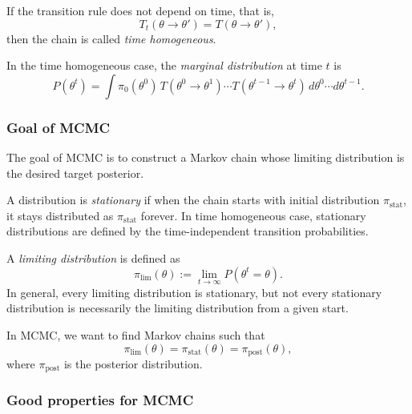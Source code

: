 \documentclass[11pt, titlepage]{article} %
\numberwithin{equation}{section}
\theoremstyle{definition}
\numberwithin{assumption}{section}
\begin{document}
If the transition rule does not depend on time, that is,
\begin{equation*}
    T_t(\theta\to \theta')=T(\theta\to \theta'),
\end{equation*}
then the chain is called \textit{time homogeneous}.

In the time homogeneous case, the \textit{marginal distribution} at time $t$ is
\begin{equation*}
    P(\theta^t)
    =
    \int \pi_0(\theta^0)\,T(\theta^0\to \theta^1)\cdots T(\theta^{t-1}\to \theta^t)\,d\theta^0\cdots d\theta^{t-1}.
\end{equation*}

\subsubsection*{Goal of MCMC}

The goal of MCMC is to construct a Markov chain whose limiting distribution is the desired target posterior. 

A distribution is \textit{stationary} if when the chain starts with initial distribution $\pi_{\text{stat}}$, it stays distributed as $\pi_{\mathrm{stat}}$ forever. In time homogeneous case, stationary distributions are defined by the time-independent transition probabilities. 

A \textit{limiting distribution} is defined as
\begin{equation*}
    \pi_{\mathrm{lim}}(\theta)
    :=
    \lim_{t\to\infty} P(\theta^t=\theta).
\end{equation*}
In general, every limiting distribution is stationary, but not every stationary distribution is necessarily the limiting distribution from a given start.

In MCMC, we want to find Markov chains such that
\begin{equation*}
    \pi_{\mathrm{lim}}(\theta)=
    \pi_{\mathrm{stat}}(\theta)=
    \pi_{\mathrm{post}}(\theta),
\end{equation*}
where $\pi_{\mathrm{post}}$ is the posterior distribution. 

\subsubsection*{Good properties for MCMC}
\end{document}
